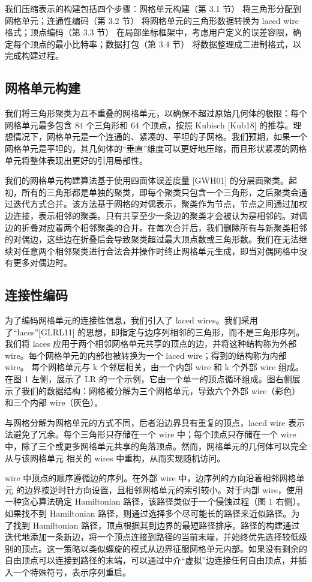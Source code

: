 我们压缩表示的构建包括四个步骤：网格单元构建（第 3.1 节） 将三角形分配到 网格单元；连通性编码（第 3.2 节） 将网格单元的三角形数据转换为 laced wire 格式；顶点编码（第 3.3 节） 在局部坐标框架中，考虑用户定义的误差容限，确定每个顶点的最小比特率；数据打包（第 3.4 节） 将数据整理成二进制格式，以完成构建过程。

\subsection{网格单元构建}

我们将三角形聚类为互不重叠的网格单元，以确保不超过原始几何体的极限：每个网格单元最多包含 84 个三角形和 64 个顶点，按照 Kubisch [Kub18] 的推荐。理想情况下，网格单元是一个连通的、紧凑的、平坦的子网格。我们预期，如果一个网格单元是平坦的，其几何体的“垂直”维度可以更好地压缩，而且形状紧凑的网格单元将整体表现出更好的引用局部性。

我们的网格单元构建算法基于使用四面体误差度量 [GWH01] 的分层面聚类。起初，所有的三角形都是单独的聚类，即每个聚类只包含一个三角形，之后聚类会通过迭代方式合并。该方法基于网格的对偶表示，聚类作为节点，节点之间通过加权边连接，表示相邻的聚类。只有共享至少一条边的聚类才会被认为是相邻的。对偶边的折叠对应着两个相邻聚类的合并。在每次合并后，我们删除所有与新聚类相邻的对偶边，这些边在折叠后会导致聚类超过最大顶点数或三角形数。我们在无法继续对任意两个相邻聚类进行合法合并操作时终止网格单元生成，即当对偶网格中没有更多对偶边时。

\subsection{连接性编码}

为了编码网格单元的连接性信息，我们引入了 laced wires。我们采用了“laces”[GLRL11] 的思想，即指定与边序列相邻的三角形，而不是三角形序列。我们将 laces 应用于两个相邻网格单元共享的顶点的边，并将这种结构称为外部 wire。每个网格单元的内部也被转换为一个 laced wire；得到的结构称为内部 wire。
每个网格单元与 k 个邻居相关，由一个内部 wire 和 k 个外部 wire 组成。在图 1 左侧，展示了 LR 的一个示例，它由一个单一的顶点循环组成。图右侧展示了我们的数据结构：网格被分解为三个网格单元，导致六个外部 wire（彩色）和三个内部 wire（灰色）。

与网格分解为网格单元的方式不同，后者沿边界具有重复的顶点，laced wire 表示法避免了冗余。每个三角形只存储在一个 wire 中；每个顶点只存储在一个 wire 中，除了三个或更多网格单元共享的角落顶点。然而，网格单元的几何体可以完全从与该网格单元 相关的 wires 中重构，从而实现随机访问。

wire 中顶点的顺序遵循边的序列。在外部 wire 中，边序列的方向沿着相邻网格单元 的边界按逆时针方向设置，且相邻网格单元的索引较小。对于内部 wire，使用一种贪心算法确定 Hamiltonian 路径，该路径类似于一个侵蚀过程（图 1 右侧）。如果找不到 Hamiltonian 路径，则通过选择多个尽可能长的路径来近似路径。为了找到 Hamiltonian 路径，顶点根据其到边界的最短路径排序。路径的构建通过迭代地添加一条新边，将一个顶点连接到路径的当前末端，并始终优先选择较低级别的顶点。这一策略以类似螺旋的模式从边界征服网格单元内部。如果没有剩余的自由顶点可以连接到路径的末端，可以通过中介“虚拟”边连接任何自由顶点，并插入一个特殊符号，表示序列重启。

